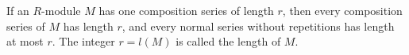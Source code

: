 If an $R$-module $M$ has one composition series of length $r$, then every composition series of $M$ has length $r$, and every normal series without repetitions has length at most $r$. The integer $r = l(M)$ is called the length of $M$.
